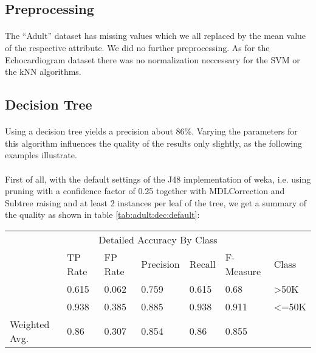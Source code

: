 \documentclass[paper=a4, fontsize=11pt]{scrartcl} %
\numberwithin{equation}{section} %
\numberwithin{figure}{section} %
\numberwithin{table}{section} %
\begin{document}
\subsection{Preprocessing}

\paragraph{}The ``Adult'' dataset has missing values which we all replaced by the mean value of the respective attribute. We did no further preprocessing. As for the Echocardiogram dataset there was no normalization neccessary for the SVM or the kNN algorithms.


\subsection{Decision Tree}
\paragraph{}Using a decision tree yields a precision about 86\%. Varying the parameters for this algorithm influences the quality of the results only slightly, as the following examples illustrate.

\paragraph{}First of all, with the default settings of the J48 implementation of weka, i.e. using pruning with a confidence factor of 0.25 together with MDLCorrection and Subtree raising and at least 2 instances per leaf of the tree, we get a summary of the quality as shown in table \ref{tab:adult:dec:default}:
 
\begin{table*}[htb]\centering
    \begin{tabular*}{\columnwidth}{@{}lllllll@{}}
        \toprule 
        \multicolumn{7}{c}{Detailed Accuracy By Class} \\ 
               & TP Rate & FP Rate & Precision & Recall &  F-Measure &  Class \\ \midrule  
               & 0.615   & 0.062   & 0.759     & 0.615  &  0.68      &  >50K  \\  
               & 0.938   & 0.385   & 0.885     & 0.938  &  0.911     &  <=50K \\  
Weighted Avg.  & 0.86    & 0.307   & 0.854     & 0.86   &  0.855     &        \\  \bottomrule 
    \end{tabular*}
\caption{Decision Tree -- Default Settings} 
\label{tab:adult:dec:default}
\end{table*}
\FloatBarrier
\end{document}
